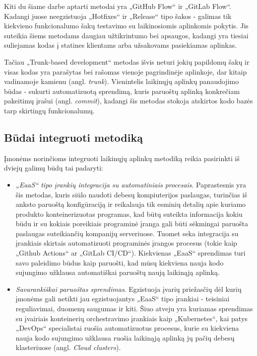 \documentclass{VUMIFPSkursinis}
\begin{document}
Kiti du šiame darbe aptarti metodai yra „GitHub Flow“ ir „GitLab Flow“. Kadangi juose neegzistuoja „Hotfixes“ ir „Release“ tipo šakos - galimas tik kiekvieno funkcionalumo šakų testavimo su laikinosiomis aplinkomis pokytis. Jis suteikia šiems metodams daugiau užtikrintumo bei apsaugos, kadangi yra tiesiai suliejamas kodas į statines klientams arba užsakovams pasiekiamas aplinkas.

Tačiau „Trunk-based development“ metodas išvis neturi jokių papildomų šakų ir visas kodas yra parašytas bei rašomas vienoje pagrindinėje aplinkoje, dar kitaip vadinamoje kamienu (angl. \textit{trunk}). Vienintelis laikinųjų aplinkų panaudojimo būdas - sukurti automatizuotą sprendimą, kuris paruoštų aplinką konkrečiam pakeitimų įrašui (angl. \textit{commit}), kadangi šis metodas stokoja atskirtos kodo bazės tarp skirtingų funkcionalumų.


\subsection{Būdai integruoti metodiką}

Įmonėms norinčioms integruoti laikinųjų aplinkų metodiką reikia pasirinkti iš dviejų galimų būdų tai padaryti:

\begin{itemize}
  \item \textit{„EaaS“ tipo įrankių integracija su automatiniais procesais}. Paprastesnis yra šis metodas, kuris siūlo naudoti debesų kompiuterijos paslaugas, turinčias iš anksto paruoštą konfigūraciją ir reikalauja tik esminių detalių apie kuriamo produkto konteinerizuotas programas, kad būtų suteikta informacija kokiu būdu ir su kokiais poreikiais programinė įranga gali būti sėkmingai paruošta paslaugas suteikiančių kompanijų serveriuose. Tuomet seka integracija su įrankiais skirtais automatizuoti programinės įrangos procesus (tokie kaip „Github Actions“ ar „GitLab CI/CD“). Kiekvienas „EaaS“ sprendimas turi savo paleidimo būdus kaip paruošti, kad mūsų kiekviena nauja kodo sujungimo užklausa automatiškai paruoštų naują laikinąją aplinką.

  \item \textit{Savarankiškai paruoštas sprendimas}. Egzistuoja įvarių priežasčių dėl kurių įmonėms gali netikti jau egzistuojantys „EaaS“ tipo įrankiai - teisiniai reguliavimai, duomenų saugumas ir kiti. Šiuo atveju yra kuriamas sprendimas su įvairiais konteinerių orchestravimo įrankiais kaip „Kubernetes“, kai patys „DevOps“ specialistai ruošia automatizuotus procesus, kurie su kiekviena nauja kodo sujungimo užklausa ruošia laikinąją aplinką jų pačių debesų klasteriuose (angl. \textit{Cloud clusters}).

\end{itemize}
\end{document}
